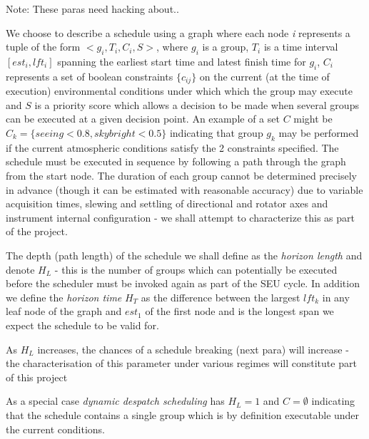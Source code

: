 Note: These paras need hacking about..

We choose to describe a schedule using a graph where each node \emph{i} represents a tuple of the form $<g_i,T_i,C_i,S>$, where $g_i$ is a group, $T_i$ is a time interval $[est_i, lft_i]$ spanning the earliest start time and latest finish time for $g_i$, $C_i$ represents a set of boolean constraints $\{c_{ij}\}$ on the current (at the time of execution) environmental conditions under which which the group may execute and $S$ is a priority score which allows a decision to be made when several groups can be executed at a given decision point. An example of a set $C$ might be $C_k = \{seeing < 0.8, skybright < 0.5\}$ indicating that group $g_k$ may be performed if the current atmospheric conditions satisfy the 2 constraints specified. The schedule must be executed in sequence by following a path through the graph from the start node. The duration of each group cannot be determined precisely in advance (though it can be estimated with reasonable accuracy) due to variable acquisition times, slewing and settling of directional and rotator axes and instrument internal configuration - we shall attempt to characterize this as part of the project.

The depth (path length) of the schedule we shall define as the \emph{horizon length} and denote $H_L$ - this is the number of groups which can potentially be executed before the scheduler must be invoked again as part of the SEU cycle. In addition we define the \emph{horizon time} $H_T$ as the difference between the largest $lft_k$ in any leaf node of the graph and $est_1$ of the first node and is the longest span we expect the schedule to be valid for. 


As $H_L$ increases, the chances of a schedule breaking (next para) will increase - the characterisation of this parameter under various regimes will constitute part of this project

As a special case \emph{dynamic despatch scheduling} has $H_L=1$ and $C=\emptyset$ indicating that the schedule contains a single group which is by definition executable under the current conditions.

